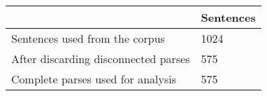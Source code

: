 	\begin{tabular}{|l|l|}
		\hline
	 & Sentences \\ 
		\hline
		Sentences used from the corpus & 1024\\ 
		\hline
		After discarding disconnected parses & 575\\ 
		\hline
		Complete parses used for analysis & 575\\ 
		\hline
	\end{tabular}

